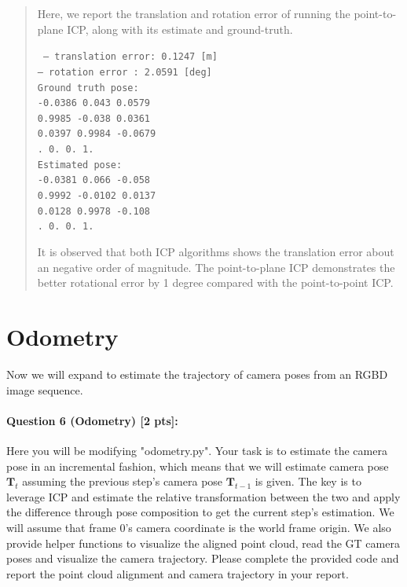 \documentclass[11pt]{article}
\begin{document}
\begin{quote}
Here, we report the translation and rotation error of running the point-to-plane ICP, along with its estimate and ground-truth.

{\tt
-- translation error: 0.1247 [m]    \\
-- rotation error   : 2.0591 [deg]  \\
Ground truth pose:  \\
\lbrack {} -0.0386  0.043   0.0579 \rbrack \\
  0.9985 -0.038   0.0361 \rbrack \\ 
  0.0397  0.9984 -0.0679 \rbrack \\ 
.      0.      0.      1.     \rbrack \rbrack \\
Estimated pose: \\
\lbrack {} -0.0381  0.066  -0.058  \rbrack \\
  0.9992 -0.0102  0.0137 \rbrack \\
  0.0128  0.9978 -0.108  \rbrack \\
.      0.      0.      1.     \rbrack \rbrack \\
}

It is observed that both ICP algorithms shows the translation error about an negative order of magnitude. The point-to-plane ICP demonstrates the better rotational error by 1 degree compared with the point-to-point ICP.

\end{quote}

\pagebreak

\section*{Odometry} 
Now we will expand to estimate the trajectory of camera poses from an RGBD image sequence.

\paragraph{Question 6 (Odometry) [2 pts]:}
Here you will be modifying "odometry.py". Your task is to estimate the camera pose in an incremental fashion, which means that we will estimate camera pose $\mathbf{T}_t$ assuming the previous step's camera pose $\mathbf{T}_{t-1}$ is given. The key is to leverage ICP and estimate the relative transformation between the two and apply the difference through pose composition to get the current step's estimation. We will assume that frame 0's camera coordinate is the world frame origin. We also provide helper functions to visualize the aligned point cloud, read the GT camera poses and visualize the camera trajectory. Please complete the provided code and report the point cloud alignment and camera trajectory in your report. 
\end{document}
